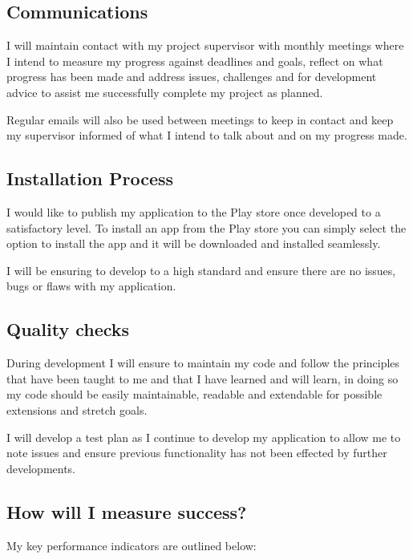 \subsection{Communications}\label{communications}

I will maintain contact with my project supervisor with monthly meetings
where I intend to measure my progress against deadlines and goals,
reflect on what progress has been made and address issues, challenges
and for development advice to assist me successfully complete my project
as planned.

Regular emails will also be used between meetings to keep in contact and
keep my supervisor informed of what I intend to talk about and on my
progress made.

\subsection{Installation Process}\label{installation-process}

I would like to publish my application to the Play store once developed
to a satisfactory level. To install an app from the Play store you can
simply select the option to install the app and it will be downloaded
and installed seamlessly.

I will be ensuring to develop to a high standard and ensure there are no
issues, bugs or flaws with my application.

\subsection{Quality checks}\label{quality-checks}

During development I will ensure to maintain my code and follow the
principles that have been taught to me and that I have learned and will
learn, in doing so my code should be easily maintainable, readable and
extendable for possible extensions and stretch goals.

I will develop a test plan as I continue to develop my application to
allow me to note issues and ensure previous functionality has not been
effected by further developments.

\subsection{How will I measure
success?}\label{how-will-i-measure-success}

My key performance indicators are outlined below:

